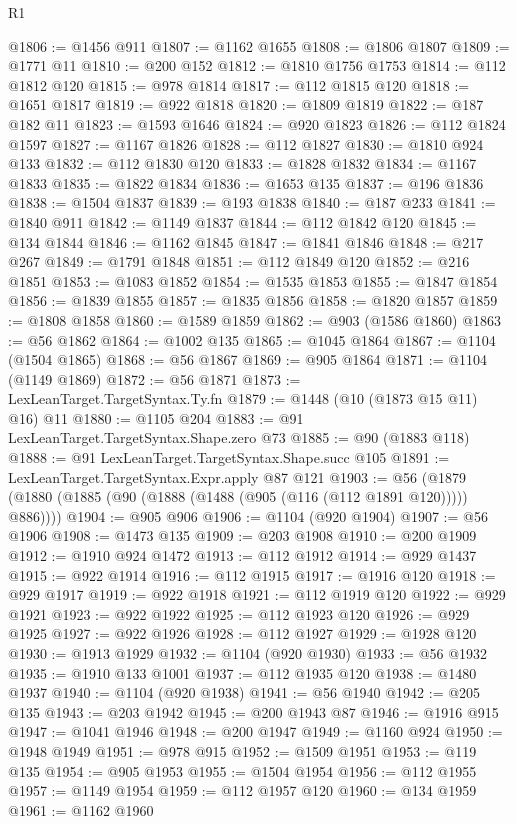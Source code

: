 \begin{lexlean}{R1}
\begin{coremodule}
@1806 := @1456 @911
@1807 := @1162 @1655
@1808 := @1806 @1807
@1809 := @1771 @11
@1810 := @200 @152
@1812 := @1810 @1756 @1753
@1814 := @112 @1812 @120
@1815 := @978 @1814
@1817 := @112 @1815 @120
@1818 := @1651 @1817
@1819 := @922 @1818
@1820 := @1809 @1819
@1822 := @187 @182 @11
@1823 := @1593 @1646
@1824 := @920 @1823
@1826 := @112 @1824 @1597
@1827 := @1167 @1826
@1828 := @112 @1827
@1830 := @1810 @924 @133
@1832 := @112 @1830 @120
@1833 := @1828 @1832
@1834 := @1167 @1833
@1835 := @1822 @1834
@1836 := @1653 @135
@1837 := @196 @1836
@1838 := @1504 @1837
@1839 := @193 @1838
@1840 := @187 @233
@1841 := @1840 @911
@1842 := @1149 @1837
@1844 := @112 @1842 @120
@1845 := @134 @1844
@1846 := @1162 @1845
@1847 := @1841 @1846
@1848 := @217 @267
@1849 := @1791 @1848
@1851 := @112 @1849 @120
@1852 := @216 @1851
@1853 := @1083 @1852
@1854 := @1535 @1853
@1855 := @1847 @1854
@1856 := @1839 @1855
@1857 := @1835 @1856
@1858 := @1820 @1857
@1859 := @1808 @1858
@1860 := @1589 @1859
@1862 := @903 (@1586 @1860)
@1863 := @56 @1862
@1864 := @1002 @135
@1865 := @1045 @1864
@1867 := @1104 (@1504 @1865)
@1868 := @56 @1867
@1869 := @905 @1864
@1871 := @1104 (@1149 @1869)
@1872 := @56 @1871
@1873 := LexLeanTarget.TargetSyntax.Ty.fn
@1879 := @1448 (@10 (@1873 @15 @11) @16) @11
@1880 := @1105 @204
@1883 := @91 LexLeanTarget.TargetSyntax.Shape.zero @73
@1885 := @90 (@1883 @118)
@1888 := @91 LexLeanTarget.TargetSyntax.Shape.succ @105
@1891 := LexLeanTarget.TargetSyntax.Expr.apply @87 @121
@1903 := @56 (@1879 (@1880 (@1885 (@90 (@1888 (@1488 (@905 (@116 (@112 @1891 @120))))) @886))))
@1904 := @905 @906
@1906 := @1104 (@920 @1904)
@1907 := @56 @1906
@1908 := @1473 @135
@1909 := @203 @1908
@1910 := @200 @1909
@1912 := @1910 @924 @1472
@1913 := @112 @1912
@1914 := @929 @1437
@1915 := @922 @1914
@1916 := @112 @1915
@1917 := @1916 @120
@1918 := @929 @1917
@1919 := @922 @1918
@1921 := @112 @1919 @120
@1922 := @929 @1921
@1923 := @922 @1922
@1925 := @112 @1923 @120
@1926 := @929 @1925
@1927 := @922 @1926
@1928 := @112 @1927
@1929 := @1928 @120
@1930 := @1913 @1929
@1932 := @1104 (@920 @1930)
@1933 := @56 @1932
@1935 := @1910 @133 @1001
@1937 := @112 @1935 @120
@1938 := @1480 @1937
@1940 := @1104 (@920 @1938)
@1941 := @56 @1940
@1942 := @205 @135
@1943 := @203 @1942
@1945 := @200 @1943 @87
@1946 := @1916 @915
@1947 := @1041 @1946
@1948 := @200 @1947
@1949 := @1160 @924
@1950 := @1948 @1949
@1951 := @978 @915
@1952 := @1509 @1951
@1953 := @119 @135
@1954 := @905 @1953
@1955 := @1504 @1954
@1956 := @112 @1955
@1957 := @1149 @1954
@1959 := @112 @1957 @120
@1960 := @134 @1959
@1961 := @1162 @1960

\end{coremodule}
\end{lexlean}
